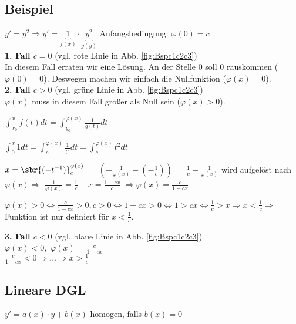 \subsection{Beispiel}
$ y' = y^2 \Rightarrow y' = \underbrace{1}_{f(x)} \cdot \underbrace{y^2}_{g(y)}$ Anfangsbedingung: $ \varphi(0) = c$\\

\textbf{1. Fall \underline{$c=0$}} (vgl. rote Linie in Abb. \ref{fig:Bspc1c2c3})\\
In diesem Fall erraten wir eine Lösung. An der Stelle 0 soll 0 rauskommen ($\varphi(0)=0$). Deswegen machen wir einfach die Nullfunktion ($\varphi(x)=0$).\\

\textbf{2. Fall \underline{$c>0$}} (vgl. grüne Linie in Abb. \ref{fig:Bspc1c2c3})\\
$ \varphi(x)$ muss in diesem Fall großer als Null sein ($\varphi(x) > 0$). 

$ \int_{x_0}^{x} f(t) dt = \int_{y_0}^{\varphi(x)} \frac{1}{g(t)} dt$

$\int_{0}^{x} 1 dt = \int_{c}^{\varphi(x)} \frac{1}{t^2} dt = \int_{c}^{\varphi(x)} t^2 dt$

$x=\sbr{(-t^{-1})}_c^{\varphi(x)}$
$=(-\frac{1}{\varphi(x)} - (-\frac{1}{c}) )$
$=\frac{1}{c} - \frac{1}{\varphi(x)}$ wird aufgelöst nach $\varphi(x) \Rightarrow$ 
$\frac{1}{\varphi(x)} = \frac{1}{c} - x = \frac{1-cx}{c} $
$\Rightarrow \varphi(x) = \frac{c}{1-cx}$

\TODO

$
\varphi(x) > 0 \Leftrightarrow
\frac{c}{1-cx} > 0, c>0 \Leftrightarrow
1-cx > 0 \Leftrightarrow
1 > cx \Leftrightarrow \frac{1}{c} > x \Rightarrow x < \frac{1}{c} \Rightarrow $ Funktion ist nur definiert für $x < \frac{1}{c}.
$

\textbf{3. Fall \underline{$c<0$}} (vgl. blaue Linie in Abb. \ref{fig:Bspc1c2c3})\\
$ \varphi(x) < 0, $
$ \varphi(x) = \frac{c}{1-cx}$\\

$ \boxed{\frac{c}{1-cx} < 0 \Rightarrow ... \Rightarrow x > \frac{1}{c}} $

\subsection{Lineare DGL}
$y' = a(x) \cdot y + b(x)$ homogen, falls $b(x) = 0$

